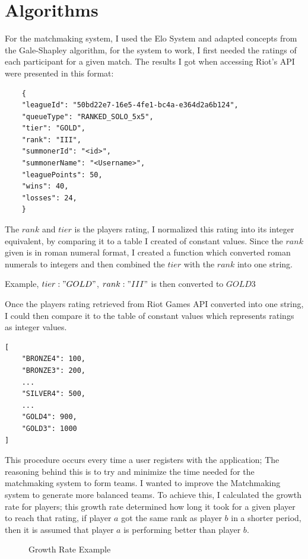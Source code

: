 \section{Algorithms}
For the matchmaking system, I used the Elo System and adapted concepts from the Gale-Shapley algorithm, for the system to work, I first needed the ratings of each participant for a given match. The results I got when accessing Riot's API were presented in this format:\hfill \break
\begin{verbatim}
	{
	"leagueId": "50bd22e7-16e5-4fe1-bc4a-e364d2a6b124",
	"queueType": "RANKED_SOLO_5x5",
	"tier": "GOLD",
	"rank": "III",
	"summonerId": "<id>",
	"summonerName": "<Username>",
	"leaguePoints": 50,
	"wins": 40,
	"losses": 24,
	}
\end{verbatim}

The $rank$ and $tier$ is the players rating, I normalized this rating into its integer equivalent, by comparing it to a table I created of constant values.
Since the $rank$ given is in roman numeral format, I created a function which converted roman numerals to integers and then combined the $tier$ with the $rank$ into one string.\hfill \break

Example, $tier: "GOLD"$, $ rank: "III"$ is then converted to $GOLD3$

\newpage
Once the players rating retrieved from Riot Games API converted into one string, I could then compare it to the table of constant values which represents ratings as integer values.

\begin{verbatim}
[
	"BRONZE4": 100,
	"BRONZE3": 200,
	...
	"SILVER4": 500,
	...
	"GOLD4": 900,
	"GOLD3": 1000
]
\end{verbatim}
\hfill \break
This procedure occurs every time a user registers with the application; The reasoning behind this is to try and minimize the time needed for the matchmaking system to form teams.\hfill \break
I wanted to improve the Matchmaking system to generate more balanced teams.
To achieve this, I calculated the growth rate \cite{d2010production} for players; this growth rate determined how long it took for a given player to reach that rating, if player $a$ got the same rank as player $b$ in a shorter period, then it is assumed that player $a$ is performing better than player $b$.

\begin{figure}[H]
	\centering
{}
	\caption{Growth Rate Example}
	\label{tikz:growth}
\end{figure}

